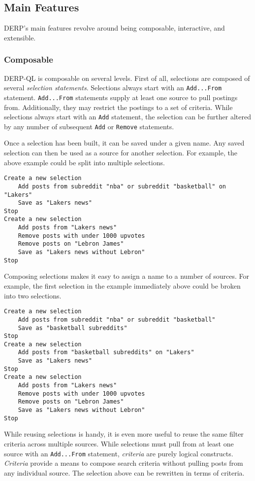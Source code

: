 \subsection{Main Features}
DERP's main features revolve around being composable, interactive, and extensible. 
\subsubsection{Composable}
\label{subsub:Composable}
DERP-QL is composable on several levels. First of all, selections are composed of several \textit{selection statements}.
Selections always start with an \texttt{Add...From} statement. \texttt{Add...From} statements supply at least one source to pull postings from. Additionally, they may restrict the postings to a set of criteria. While selections always start with an \texttt{Add} statement, the selection can be further altered by any number of subsequent \texttt{Add} or \texttt{Remove} statements. 

Once a selection has been built, it can be saved under a given name. Any saved selection can then be used as a source for another selection. For example, the above example could be split into multiple selections.

\begin{lstlisting}
Create a new selection
    Add posts from subreddit "nba" or subreddit "basketball" on "Lakers"
    Save as "Lakers news"
Stop
Create a new selection
    Add posts from "Lakers news"
    Remove posts with under 1000 upvotes
    Remove posts on "Lebron James"
    Save as "Lakers news without Lebron"
Stop
\end{lstlisting}

Composing selections makes it easy to assign a name to a number of sources. For example, the first selection in the example immediately above could be broken into two selections.

\begin{lstlisting}
Create a new selection
    Add posts from subreddit "nba" or subreddit "basketball" 
    Save as "basketball subreddits"
Stop
Create a new selection
    Add posts from "basketball subreddits" on "Lakers"
    Save as "Lakers news"
Stop
Create a new selection
    Add posts from "Lakers news"
    Remove posts with under 1000 upvotes
    Remove posts on "Lebron James"
    Save as "Lakers news without Lebron"
Stop
\end{lstlisting}

While reusing selections is handy, it is even more useful to reuse the same filter criteria across multiple sources.
While selections must pull from at least one source with an \texttt{Add...From} statement, \textit{criteria}\label{create:criteria} are purely logical constructs. \textit{Criteria} provide a means to compose search criteria without pulling posts from any individual source. The selection above can be rewritten in terms of criteria.

